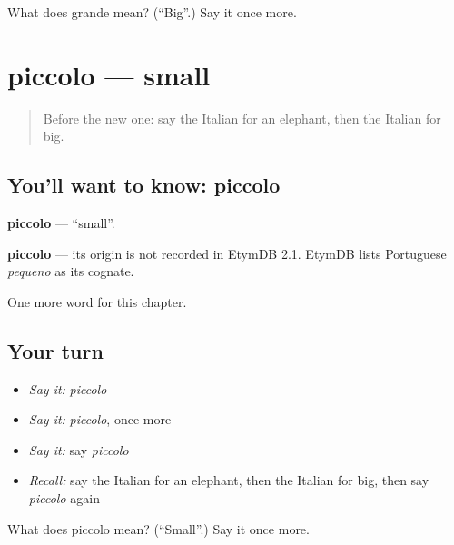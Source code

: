 \begin{tcolorbox}[breakable,colback=teal!4,colframe=teal!35!black,title={Before you move on}]
What does grande mean? (\textquotedblleft{}Big\textquotedblright{}.) Say it once more.
\end{tcolorbox}
\section[piccolo]{piccolo — small}

\label{lesson:IT-C72-piccolo}



\begin{quote}
Before the new one: say the Italian for an elephant, then the Italian for big.
\end{quote}

\subsection*{You'll want to know: piccolo}
\textbf{piccolo} — \textquotedblleft{}small\textquotedblright{}.

\begin{cousinweb}
\textbf{piccolo} — its origin is not recorded in EtymDB 2.1. EtymDB lists Portuguese \emph{pequeno} as its cognate.
\end{cousinweb}

\begin{grammarlens}[title={What you've built}]
One more word for this chapter.
\end{grammarlens}

\subsection*{Your turn}
\begin{itemize}
\raggedright
  \item \emph{Say it:} \emph{piccolo}
  \item \emph{Say it:} \emph{piccolo}, once more
  \item \emph{Say it:} say \emph{piccolo}
  \item \emph{Recall:} say the Italian for an elephant, then the Italian for big, then say \emph{piccolo} again
\end{itemize}

\begin{tcolorbox}[breakable,colback=teal!4,colframe=teal!35!black,title={Before you move on}]
What does piccolo mean? (\textquotedblleft{}Small\textquotedblright{}.) Say it once more.
\end{tcolorbox}
